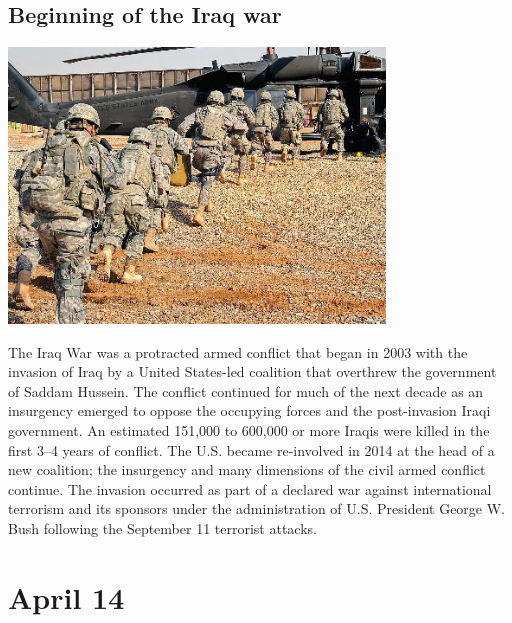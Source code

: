 \documentclass[11pt]{report}
\begin{document}
\subsection{Beginning of the Iraq war}
\vspace{2mm}\begin{center}\includegraphics[width=10cm]{./img/iraqWar.jpg}\end{center}
The Iraq War was a protracted armed conflict that began in 2003 with the invasion of Iraq by a United States-led coalition that overthrew the government of Saddam Hussein. The conflict continued for much of the next decade as an insurgency emerged to oppose the occupying forces and the post-invasion Iraqi government. An estimated 151,000 to 600,000 or more Iraqis were killed in the first 3–4 years of conflict. The U.S. became re-involved in 2014 at the head of a new coalition; the insurgency and many dimensions of the civil armed conflict continue. The invasion occurred as part of a declared war against international terrorism and its sponsors under the administration of U.S. President George W. Bush following the September 11 terrorist attacks.
\section{April 14}
\end{document}
